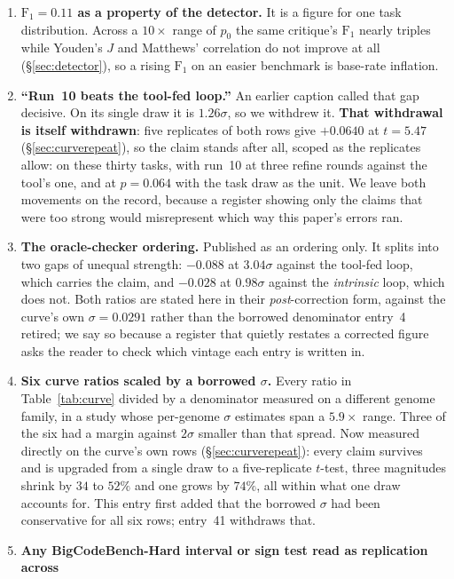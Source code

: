 \documentclass[11pt]{article}
\begin{document}
\begin{enumerate}\itemsep2pt
  \item \textbf{$\mathrm{F}_1 = 0.11$ as a property of the detector.} It is a figure for one task
    distribution. Across a $10\times$ range of $p_0$ the same critique's $\mathrm{F}_1$ nearly
    triples while Youden's $J$ and Matthews' correlation do not improve at all
    (\S\ref{sec:detector}), so a rising $\mathrm{F}_1$ on an easier benchmark is base-rate
    inflation.
  \item \textbf{``Run~10 beats the tool-fed loop.''} An earlier caption called that gap decisive.
    On its single draw it is $1.26\sigma$, so we withdrew it. \textbf{That withdrawal is itself
    withdrawn}: five replicates of both rows give $+0.0640$ at $t = 5.47$
    (\S\ref{sec:curverepeat}), so the claim stands after all, scoped as the replicates allow: on
    these thirty tasks, with run~10 at three refine rounds against the tool's one, and at
    $p = 0.064$ with the task draw as the unit. We leave both movements on the record, because a register showing only the claims that were too strong would misrepresent
    which way this paper's errors ran.
  \item \textbf{The oracle-checker ordering.} Published as an ordering only. It splits into two
    gaps of unequal strength: $-0.088$ at $3.04\sigma$ against the tool-fed loop, which carries
    the claim, and $-0.028$ at $0.98\sigma$ against the \emph{intrinsic} loop, which does not.
    Both ratios are stated here in their \emph{post}-correction form, against the curve's own
    $\sigma = 0.0291$ rather than the borrowed denominator entry~4 retired; we say so because a
    register that quietly restates a corrected figure asks the reader to check which vintage
    each entry is written in.
  \item \textbf{Six curve ratios scaled by a borrowed $\sigma$.} Every ratio in
    Table~\ref{tab:curve} divided by a denominator measured on a different genome family, in a
    study whose per-genome $\sigma$ estimates span a $5.9\times$ range. Three of the
    six had a margin against $2\sigma$ smaller than that spread. Now measured directly on the
    curve's own rows (\S\ref{sec:curverepeat}): every claim survives and is upgraded from a
    single draw to a five-replicate $t$-test, three magnitudes shrink by $34$ to $52\%$ and one
    grows by $74\%$, all within what one draw accounts for. This entry first added that the borrowed $\sigma$ had
    been conservative for all six rows; entry~41 withdraws that.
  \item \textbf{Any BigCodeBench-Hard interval or sign test read as replication across
}
\end{enumerate}
\end{document}
